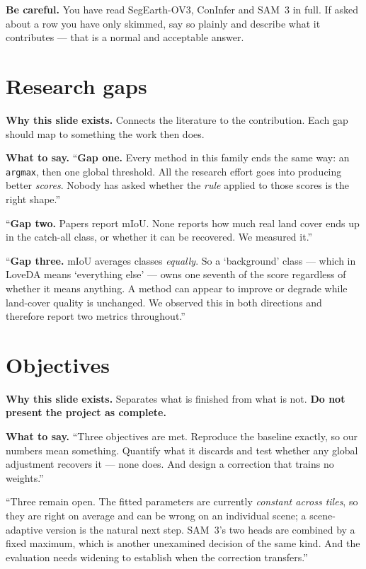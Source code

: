 \documentclass[11pt,a4paper]{article}
\newcommand{\best}[1]{\textcolor{acc}{\textbf{#1}}}
\newcommand{\bad}[1]{\textcolor{warn}{#1}}
\newcommand{\why}[1]{\par\smallskip\noindent\textbf{Why this slide exists.} #1}
\newcommand{\say}[1]{\par\smallskip\noindent\textbf{What to say.} #1}
\newcommand{\care}[1]{\par\smallskip\noindent\bad{\textbf{Be careful.}} #1}
\begin{document}
\care{You have read SegEarth-OV3, ConInfer and SAM~3 in full. If asked about a
row you have only skimmed, say so plainly and describe what it contributes ---
that is a normal and acceptable answer.}

\section{Research gaps}
\why{Connects the literature to the contribution. Each gap should map to
something the work then does.}

\say{``\textbf{Gap one.} Every method in this family ends the same way: an
\texttt{argmax}, then one global threshold. All the research effort goes into
producing better \emph{scores}. Nobody has asked whether the \emph{rule} applied
to those scores is the right shape.''

\smallskip
``\textbf{Gap two.} Papers report mIoU. None reports how much real land cover
ends up in the catch-all class, or whether it can be recovered. We measured it.''

\smallskip
``\textbf{Gap three.} mIoU averages classes \emph{equally}. So a `background'
class --- which in LoveDA means `everything else' --- owns one seventh of the
score regardless of whether it means anything. A method can appear to improve or
degrade while land-cover quality is unchanged. We observed this in both
directions and therefore report two metrics throughout.''}

\section{Objectives}
\why{Separates what is finished from what is not. \best{Do not present the
project as complete.}}

\say{``Three objectives are met. Reproduce the baseline exactly, so our numbers
mean something. Quantify what it discards and test whether any global
adjustment recovers it --- none does. And design a correction that trains no
weights.''

\smallskip
``Three remain open. The fitted parameters are currently \emph{constant across
tiles}, so they are right on average and can be wrong on an individual scene; a
scene-adaptive version is the natural next step. SAM~3's two heads are combined
by a fixed maximum, which is another unexamined decision of the same kind. And
the evaluation needs widening to establish when the correction transfers.''}
\end{document}
